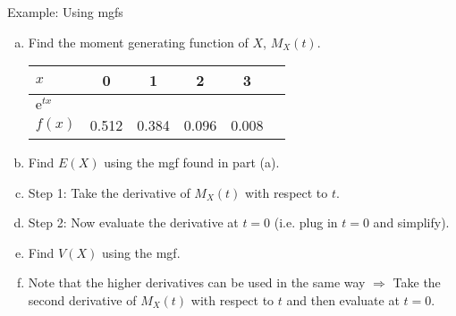 \documentclass{article}
\newcommand{\e}{\mathrm{e}}		%
\begin{document}
Example: Using mgfs\bigskip
\begin{enumerate}[(a)]
    \item Find the moment generating function of $X$, $M_X(t)$.\bigskip\\
    \begin{tabular}{| l || c | c | c | c | c |}
        \hline
        $x$ & 0 & 1 & 2 & 3\\
        \hline
        $\e^{tx}$ & \hspace{40pt} & \hspace{30pt} & \hspace{30pt} & \hspace{30pt}\\
        \hline
        $f(x)$ & 0.512 & 0.384 & 0.096 & 0.008\\
        \hline
    \end{tabular}\vspace{40pt}
    \item Find $E(X)$ using the mgf found in part (a).
    \item[] Step 1: Take the derivative of $M_X(t)$ with respect to $t$.\vspace{40pt}
    \item[] Step 2: Now evaluate the derivative at $t = 0$ (i.e. plug in $t = 0$ and simplify).\vspace{80pt}
    \item Find $V(X)$ using the mgf.
    \item[] Note that the higher derivatives can be used in the same way  $\Longrightarrow$ Take the second derivative of $M_X(t)$ with respect to $t$ and then evaluate at $t = 0$.\vspace{130pt}
\end{enumerate}\bigskip
\end{document}

